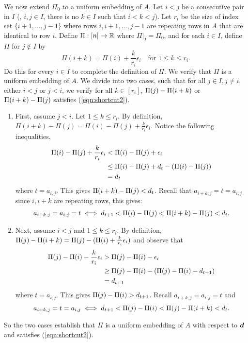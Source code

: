 \documentclass[runningheads]{llncs}
\begin{document}
\begin{proofof}{}
We now extend $\Pi_0$ to a uniform embedding of $A$.
Let $i<j$ be a consecutive pair in $I$ (\ie, $i,j\in I$, there is no $k\in I$ such that $i<k<j$). Let $r_i$ be the size of index set $\{i+1, \dots, j-1\}$ where rows $i, i+1, \dots, j-1$ are repeating rows in $A$ that are identical to row $i$. 
Define $\Pi:[n]\to\rr$ where $\Pi|_{I} = \Pi_0$, and for each $i\in I$, define $\Pi$ for $j\not\in I$ by 
$$\Pi(i+k) = \Pi(i)+\frac{k}{r_i} \epsilon_i \quad\text{for }1\leq k\leq r_i.
$$
Do this for every $i\in I$ to complete the definition of $\Pi$. We verify that $\Pi$ is a uniform embedding of $A.$ 
We divide into two cases, such that for all $j\in I, j\neq i,$ either $i<j$ or $j<i$, we verify for all $k\in [r_i]$, $\dist{i+k}j$ or $\dist j{i+k}$ satisfies (\ref{eqn:shortcut2}).
\begin{enumerate}
\item First, assume $j<i$. Let $1\leq k \leq r_i$. By definition, $\Pi(i+k) - \Pi(j) = \Pi(i)-\Pi(j)+ \frac{k}{r_i}\epsilon_i$. Notice the following inequalities,
\begin{equation*}
\begin{split}
    \Pi(i)-\Pi(j) + \frac{k}{r_i}\epsilon_i  &<
\Pi(i)-\Pi(j) + \epsilon_i \\  
& \leq 
\Pi(i)-\Pi(j) + d_t - (\dist ji)\\
& = d_t
\end{split}    
\end{equation*}
where $t = a_{i,j}$. This gives $\dist j{i+k} < d_t$. Recall that $a_{i+k, j} = t = a_{i,j}$ since $i, i+k$ are repeating rows, this gives:
$$ a_{i+k, j} = a_{i,j} = t \iff
d_{t+1}<\dist ji < \dist j{i+k} < d_t. $$
\item Next, assume $i<j$ and $1\leq k \leq r_i$. By definition, 
$ \dist{i+k}j = 
\Pi(j)- (\Pi(i) + \frac k{r_i}\epsilon_i) $ 
and observe that
\begin{equation*}
\begin{split}
\Pi(j)- \Pi(i) - \frac k{r_i}\epsilon_i  & > \dist ij -\epsilon_i\\
 & \geq  \dist ij - (\dist ij - d_{t+1})\\
 & = d_{t+1}
\end{split}
\end{equation*}
where $t = a_{i,j}$. This gives $ \dist ij >d_{t+1}$. Recall $a_{i+k,j} = a_{i,j} = t$ and 
$$ a_{i+k,j} = t = a_{i,j}\iff
d_{t+1}<\dist ij < \dist {i+k}j < d_t.
$$
\end{enumerate}
So the two cases establish that $\Pi$ is a uniform embedding of $A$ with respect to $\bmd$ and satisfies (\ref{eqn:shortcut2}).
\end{proofof}
\end{document}
